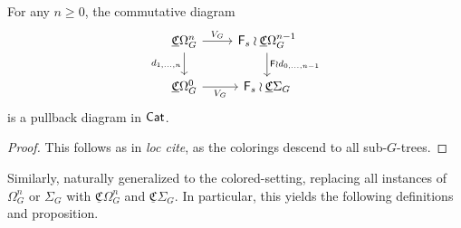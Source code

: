 \documentclass[a4paper,10pt
,draft
]{article}%
\newcommand{\UC}{\underline{\mathfrak C}}
\renewcommand{\1}{\ensuremath{\mathbb{id}}}
\begin{document}
\begin{proposition}[{cf. \cite[Prop 3.82]{BP17}}]
      For any $n \geq 0$, the commutative diagram
      \begin{equation}
            \begin{tikzcd}
                  \UC\Omega_G^n \arrow[d, "d_{1,\dots,n}"'] \arrow[r, "V_G"]
                  &
                  \mathsf F_s \wr \UC\Omega_G^{n-1} \arrow[d, "\mathsf F \wr d_{0,\dots,n-1}"]
                  \\
                  \UC\Omega_G^0 \arrow[r, "V_G"']
                  &
                  \mathsf F_s \wr \UC\Sigma_G
            \end{tikzcd}
      \end{equation}
      is a pullback diagram in $\mathsf{Cat}$.
\end{proposition}
\begin{proof}
      This follows as in \textit{loc cite}, as the colorings descend to all sub-$G$-trees.
\end{proof}


Similarly, \cite[Prop 3.47, 3.90, 4.12, 4.15, 4.26, 4.28, 4.30]{BP17} naturally generalized to the colored-setting,
replacing all instances of $\Omega_G^n$ or $\Sigma_G$ with $\UC\Omega_G^n$ and $\UC\Sigma_G$.
In particular, this yields the following definitions and proposition.


\end{document}
